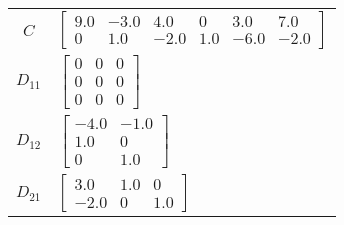 \begin{tabular}{cl}
   $C$    & $\left[\begin{matrix}9.0 & -3.0 & 4.0 & 0 & 3.0 & 7.0\\0 & 1.0 & -2.0 & 1.0 & -6.0 & -2.0\end{matrix}\right]$                                                                                                                                                   \\
 $D_{11}$ & $\left[\begin{matrix}0 & 0 & 0\\0 & 0 & 0\\0 & 0 & 0\end{matrix}\right]$                                                                                                                                                                                        \\
 $D_{12}$ & $\left[\begin{matrix}-4.0 & -1.0\\1.0 & 0\\0 & 1.0\end{matrix}\right]$                                                                                                                                                                                          \\
 $D_{21}$ & $\left[\begin{matrix}3.0 & 1.0 & 0\\-2.0 & 0 & 1.0\end{matrix}\right]$                                                                                                                                                                                          \\
\hline
\end{tabular}